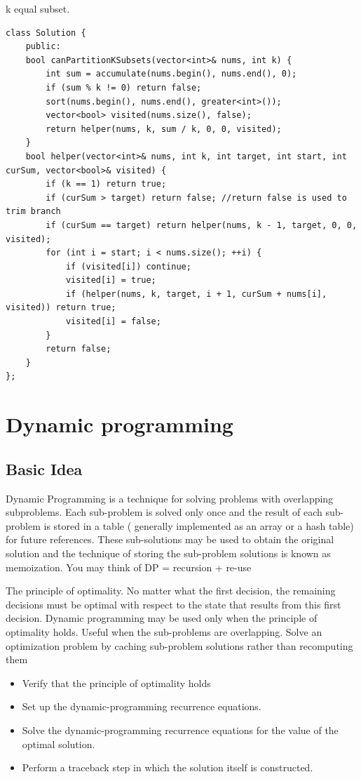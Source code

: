 \documentclass[a4paper,11pt,twoside]{book}
\begin{document}
	\par k equal subset.
	
\begin{lstlisting}
class Solution {
	public:
	bool canPartitionKSubsets(vector<int>& nums, int k) {
		int sum = accumulate(nums.begin(), nums.end(), 0);
		if (sum % k != 0) return false;
		sort(nums.begin(), nums.end(), greater<int>());
		vector<bool> visited(nums.size(), false);
		return helper(nums, k, sum / k, 0, 0, visited);
	}
	bool helper(vector<int>& nums, int k, int target, int start, int curSum, vector<bool>& visited) {
		if (k == 1) return true;
		if (curSum > target) return false; //return false is used to trim branch
		if (curSum == target) return helper(nums, k - 1, target, 0, 0, visited);  
		for (int i = start; i < nums.size(); ++i) {
			if (visited[i]) continue;
			visited[i] = true;
			if (helper(nums, k, target, i + 1, curSum + nums[i], visited)) return true;
			visited[i] = false;
		}
		return false;
	}
};	
\end{lstlisting}	
	

\section{Dynamic programming}
\subsection{Basic Idea}

	\par Dynamic Programming is a technique for solving problems with overlapping subproblems. Each sub-problem is solved only once and the result of each sub-problem is stored in a table ( generally implemented as an array or a hash table) for future references. These sub-solutions may be used to obtain the original solution and the technique of storing the sub-problem solutions is known as memoization. You may think of DP = recursion + re-use
	
	\par The principle of optimality. No matter what the first decision, the remaining decisions must be optimal with respect to the state that results from this first decision. Dynamic programming may be used only when the principle of optimality holds. Useful when the sub-problems are overlapping. Solve an optimization problem by caching  sub-problem solutions rather than recomputing them
	
	\begin{itemize}
		\item Verify that the principle of optimality holds  
				
		\item Set up the dynamic-programming recurrence equations.
		
		\item Solve the dynamic-programming recurrence equations for the value of the optimal solution.
		
		\item Perform a traceback step in which the solution itself is constructed.
	\end{itemize}
	
\end{document}
